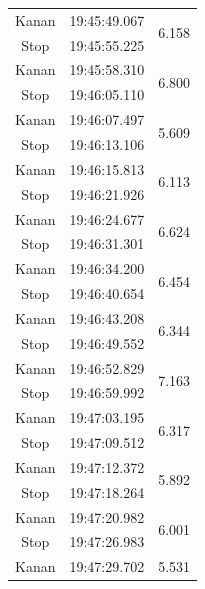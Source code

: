 \begin{longtable}{|c|c|c|}
  Kanan          & 19:45:49.067        & \multirow{2}{*}{6.158}  \\ \cline{1-2}
  Stop           & 19:45:55.225        &                         \\ \hline
  Kanan          & 19:45:58.310        & \multirow{2}{*}{6.800}  \\ \cline{1-2}
  Stop           & 19:46:05.110        &                         \\ \hline
  Kanan          & 19:46:07.497        & \multirow{2}{*}{5.609}  \\ \cline{1-2}
  Stop           & 19:46:13.106        &                         \\ \hline
  Kanan          & 19:46:15.813        & \multirow{2}{*}{6.113}  \\ \cline{1-2}
  Stop           & 19:46:21.926        &                         \\ \hline
  Kanan          & 19:46:24.677        & \multirow{2}{*}{6.624}  \\ \cline{1-2}
  Stop           & 19:46:31.301        &                         \\ \hline
  Kanan          & 19:46:34.200        & \multirow{2}{*}{6.454}  \\ \cline{1-2}
  Stop           & 19:46:40.654        &                         \\ \hline
  Kanan          & 19:46:43.208        & \multirow{2}{*}{6.344}  \\ \cline{1-2}
  Stop           & 19:46:49.552        &                         \\ \hline
  Kanan          & 19:46:52.829        & \multirow{2}{*}{7.163}  \\ \cline{1-2}
  Stop           & 19:46:59.992        &                         \\ \hline
  Kanan          & 19:47:03.195        & \multirow{2}{*}{6.317}  \\ \cline{1-2}
  Stop           & 19:47:09.512        &                         \\ \hline
  Kanan          & 19:47:12.372        & \multirow{2}{*}{5.892}  \\ \cline{1-2}
  Stop           & 19:47:18.264        &                         \\ \hline
  Kanan          & 19:47:20.982        & \multirow{2}{*}{6.001}  \\ \cline{1-2}
  Stop           & 19:47:26.983        &                         \\ \hline
  Kanan          & 19:47:29.702        & \multirow{2}{*}{5.531}  \\ \cline{1-2}

\end{longtable}
